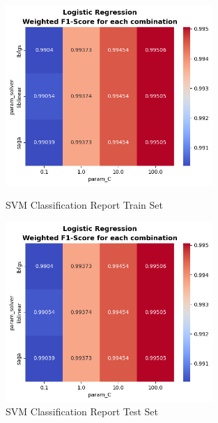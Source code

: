 \begin{figure}[H]
            \vspace{0.5cm}  %

            \begin{minipage}{\textwidth}
                \begin{minipage}[t]{0.48\textwidth}
                    \centering
                    \includegraphics[width=0.7\textwidth]{../figures/plots/section2/weighted_f1_score_for_each_combination_of_parameters_logistic_regression.png}
                    \caption{SVM Classification Report Train Set}
                    \label{fig:}
                \end{minipage}%
                \hfill%
                \begin{minipage}[t]{0.48\textwidth}
                    \centering
                    \includegraphics[width=0.7\textwidth]{../figures/plots/section2/weighted_f1_score_for_each_combination_of_parameters_logistic_regression.png}
                    \caption{SVM Classification Report Test Set}
                    \label{fig:}
                \end{minipage}  
            
            \end{minipage}
            
        \end{figure}
            
